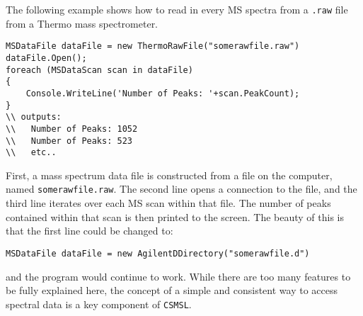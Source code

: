 The following example shows how to read in every MS spectra from a \texttt{.raw} file from a Thermo mass spectrometer.
\begin{lstlisting}
MSDataFile dataFile = new ThermoRawFile("somerawfile.raw")
dataFile.Open();                   
foreach (MSDataScan scan in dataFile)
{             
    Console.WriteLine('Number of Peaks: '+scan.PeakCount);
}
\\ outputs:
\\   Number of Peaks: 1052
\\   Number of Peaks: 523
\\   etc..
\end{lstlisting}
First, a mass spectrum data file is constructed from a file on the computer, named \texttt{somerawfile.raw}. The second line opens a connection to the file, and the third line iterates over each MS scan within that file. The number of peaks contained within that scan is then printed to the screen. The beauty of this is that the first line could be changed to:
\begin{lstlisting}
MSDataFile dataFile = new AgilentDDirectory("somerawfile.d")
\end{lstlisting}
and the program would continue to work. While there are too many features to be fully explained here, the concept of a simple and consistent way to access spectral data is a key component of \texttt{CSMSL}. 